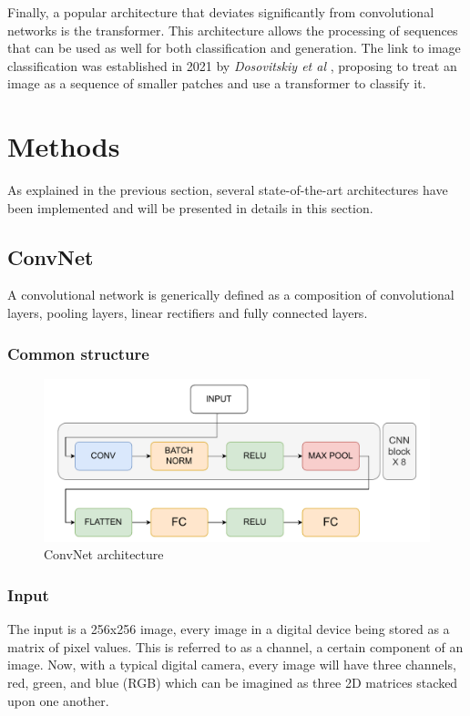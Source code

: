 \documentclass[twocolumn,superscriptaddress,aps]{revtex4-1}
\begin{document}
Finally, a popular architecture that deviates significantly from convolutional networks is the transformer. This architecture allows the processing of sequences that can be used as well for both classification and generation. The link to image classification was established in 2021 by \textit{Dosovitskiy et al} \cite{vit}, proposing to treat an image as a sequence of smaller patches and use a transformer to classify it. \\

\section{Methods}

As explained in the previous section, several state-of-the-art architectures have been implemented and will be presented in details in this section. 

\subsection{ConvNet}

A convolutional network is generically defined as a composition of convolutional layers, pooling layers, linear rectifiers and fully connected layers.

\subsubsection{Common structure}

\begin{figure}[H]
    \centering
    \includegraphics[width=0.85\linewidth]{images/cnn.pdf}
    \caption{ConvNet architecture}
    \label{fig:cnn_arch}
\end{figure}

\subsubsection{Input}
The input is a 256x256 image, every image in a digital device being stored as a matrix of pixel values. This is referred to as a channel, a certain component of an image. Now, with a typical digital camera, every image will have three channels, red, green, and blue (RGB) which can be imagined as three 2D matrices stacked upon one another.
\end{document}
